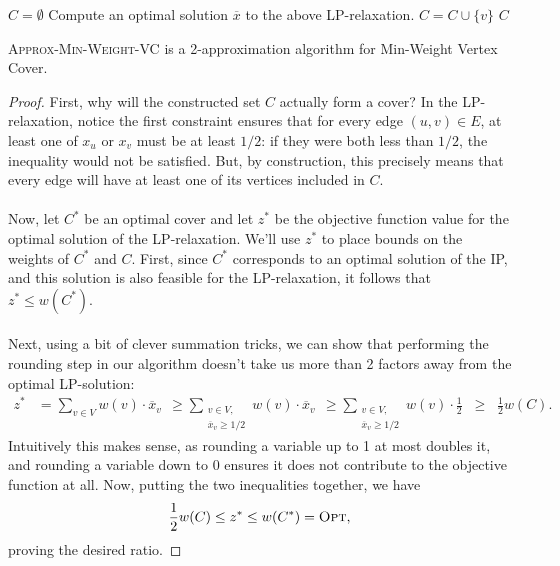 \documentclass{article}
\newenvironment{theorem}[2][Theorem]{\begin{trivlist}
\item[\hskip \labelsep {\bfseries #1}\hskip \labelsep {\bfseries #2.}]}{\end{trivlist}}
\begin{document}
\begin{algorithm}
    \renewcommand{\thealgorithm}{}
    \caption{\textsc{Approx-Min-Weight-VC}$(G, w)$}
    \begin{algorithmic}[1]
        \State $C = \emptyset$
        \State Compute an optimal solution $\overline{x}$ to the above LP-relaxation.
                \State $C = C \cup \{v\}$
            \EndIf
        \EndFor
        \State \Return $C$
    \end{algorithmic}
\end{algorithm}
\vspace{-2ex}
\begin{theorem}{4.3}
    \textsc{Approx-Min-Weight-VC} is a 2-approximation algorithm for Min-Weight Vertex Cover.

    \begin{proof}
        First, why will the constructed set $C$ actually form a cover? In the LP-relaxation, notice the first constraint ensures that for every edge $(u,v) \in E$, at least one of $x_u$ or $x_v$ must be at least $1/2$: if they were both less than $1/2$, the inequality would not be satisfied. But, by construction, this precisely means that every edge will have at least one of its vertices included in $C$.\\
        \\
        Now, let $C^*$ be an optimal cover and let $z^*$ be the objective function value for the optimal solution of the LP-relaxation. We'll use $z^*$ to place bounds on the weights of $C^*$ and $C$. First, since $C^*$ corresponds to an optimal solution of the IP, and this solution is also feasible for the LP-relaxation, it follows that $z^* \leq w(C^*)$.\\
        \\
        \noindent Next, using a bit of clever summation tricks, we can show that performing the rounding step in our algorithm doesn't take us more than 2 factors away from the optimal LP-solution:
        \begin{align*}
            z^* &= \sum_{v \in V} w(v) \cdot \overline{x}_v \;\, \geq \sum_{\substack{v \in V,\\ \overline{x}_v \geq 1/2}} w(v) \cdot \overline{x}_v \;\, \geq \sum_{\substack{v \in V,\\ \overline{x}_v \geq 1/2}} w(v) \cdot \frac{1}{2} \;\; \geq \;\; \frac{1}{2} w(C).
        \end{align*}
        Intuitively this makes sense, as rounding a variable up to 1 at most doubles it, and rounding a variable down to 0 ensures it does not contribute to the objective function at all.
        Now, putting the two inequalities together, we have
        \[
        \frac{1}{2} w(C) \leq z^* \leq w(C^*) = \textsc{Opt},
        \]
        proving the desired ratio.
    \end{proof}
\end{theorem}
\end{document}
